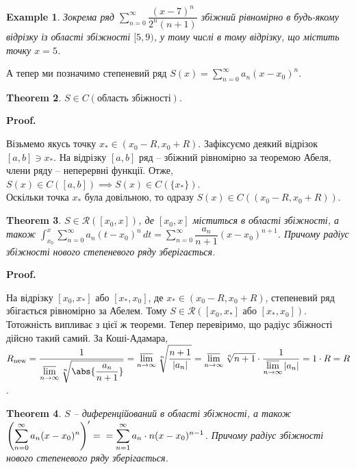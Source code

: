 \documentclass[a4paper, 10pt]{article}
\makeatletter
\DeclareMathOperator*\uplim{\overline{lim}}
\def\huge{\displaystyle}
\theoremstyle{theoremdd}
\newtheorem{theorem}{Theorem}[subsection]
\theoremstyle{theoremdd}
\theoremstyle{theoremdd}
\theoremstyle{theoremdd}
\theoremstyle{theoremdd}
\newtheorem{example}[theorem]{Example}
\theoremstyle{theoremdd}
\theoremstyle{theoremdd}
\theoremstyle{theoremdd}
\theoremstyle{theoremdd}
\renewenvironment{proof}[1][Proof.\\]{\par
\pushQED{\hfill \qed}%
\normalfont \topsep6\p@\@plus6\p@\relax
\trivlist
\item\relax
{\bfseries
#1\@addpunct{.}}\hspace\labelsep\ignorespaces
}{%
\popQED\endtrivlist\@endpefalse
}
\makeatother
\begin{document}
\begin{example}
Зокрема ряд $\huge\sum_{n=0}^\infty \dfrac{(x-7)^n}{2^n (n+1)}$ збіжний рівномірно в будь-якому відрізку із області збіжності $[5,9)$, у тому числі в тому відрізку, що містить точку $x = 5$.
\end{example}

А тепер ми позначимо степеневий ряд $\huge S(x) = \sum_{n=0}^\infty a_n(x-x_0)^n$.

\begin{theorem}
$S \in C(\text{область збіжності})$.
\end{theorem}

\begin{proof}
Візьмемо якусь точку $x_* \in (x_0-R,x_0+R)$. Зафіксуємо деякий відрізок $[a,b] \ni x_*$. На відрізку $[a,b]$ ряд -- збіжний рівномірно за теоремою Абеля, члени ряду -- неперервні функції. Отже, $S(x) \in C([a,b]) \implies S(x) \in C(\{x_*\})$.\\
Оскільки точка $x_*$ була довільною, то одразу $S(x) \in C((x_0-R, x_0+R))$.
\end{proof}

\begin{theorem}
$S \in \mathcal{R}([x_0,x])$, де $[x_0,x]$ міститься в області збіжності, а також $\huge\int_{x_0}^x \huge\sum_{n=0}^\infty a_n (t-x_0)^n\,dt = \sum_{n=0}^\infty \dfrac{a_n}{n+1}(x-x_0)^{n+1}$. Причому радіус збіжності нового степеневого ряду зберігається.
\end{theorem}

\begin{proof}
На відрізку $[x_0,x_*]$ або $[x_*,x_0]$, де $x_* \in (x_0-R,x_0+R)$, степеневий ряд збігається рівномірно за Абелем. Тому $S \in \mathcal{R}([x_0,x_*] \text{ або } [x_*,x_0])$. Тотожність випливає з цієї ж теореми. Тепер перевіримо, що радіус збіжності дійсно такий самий. За Коші-Адамара,\\
$R_{\text{new}} = \huge \dfrac{1}{\huge\uplim_{n \to \infty} \sqrt[n]{\abs{\dfrac{a_n}{n+1}}} } = \uplim_{n \to \infty} \sqrt[n]{\dfrac{n+1}{|a_n|}} = \uplim_{n \to \infty} \sqrt[n]{n+1} \cdot \dfrac{1}{\huge\uplim_{n \to \infty} |a_n|} = 1 \cdot R = R$.
\end{proof}

\begin{theorem}
$S$ -- диференційований в області збіжності, а також $\huge \left( \sum_{n=0}^\infty a_n(x-x_0)^n \right)' = \\ = \sum_{n=1}^\infty a_n\cdot n(x-x_0)^{n-1}$. Причому радіус збіжності нового степеневого ряду зберігається.
\end{theorem}
\end{document}

